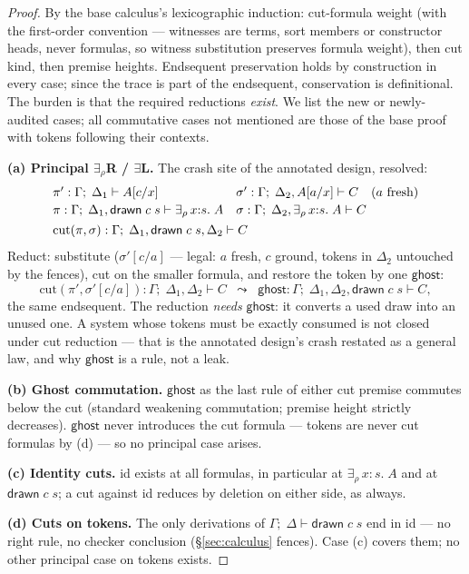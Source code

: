 \documentclass[11pt]{article}
\newcommand{\erho}[2]{\exists_{\rho}\, #1{:}#2.\;} %
\newcommand{\dtok}[2]{\mathsf{drawn}\;#1\;#2}      %
\newcommand{\ghost}{\mathsf{ghost}}
\newcommand{\seq}[3]{#1;\;#2\vdash #3}             %
\theoremstyle{definition}
\theoremstyle{remark}
\begin{document}
\begin{proof}
By the base calculus's lexicographic induction: cut-formula weight
(with the first-order convention --- witnesses are terms, sort members
or constructor heads, never formulas, so witness substitution preserves
formula weight), then cut kind, then premise heights.  Endsequent
preservation holds by construction in every case; since the trace is
part of the endsequent, conservation is definitional.  The burden is
that the required reductions \emph{exist}.  We list the new or
newly-audited cases; all commutative cases not mentioned are those of
the base proof with tokens following their contexts.

\medskip\noindent\textbf{(a) Principal $\exists_\rho$R / $\exists$L.}
The crash site of the annotated design, resolved:
\[
\begin{array}{ll}
\pi' : \seq{\Gamma}{\Delta_1}{A[c/x]}
& \sigma' : \seq{\Gamma}{\Delta_2, A[a/x]}{C} \quad (a\ \text{fresh})\\[2pt]
\pi : \seq{\Gamma}{\Delta_1, \dtok{c}{s}}{\erho{x}{s}A}
& \sigma : \seq{\Gamma}{\Delta_2, \erho{x}{s}A}{C}\\[4pt]
\multicolumn{2}{l}{\mathrm{cut}(\pi,\sigma) :
  \seq{\Gamma}{\Delta_1, \dtok{c}{s}, \Delta_2}{C}}
\end{array}
\]
Reduct: substitute ($\sigma'[c/a]$ --- legal: $a$ fresh, $c$ ground,
tokens in $\Delta_2$ untouched by the fences), cut on the smaller
formula, and restore the token by one $\ghost$:
\[
  \mathrm{cut}(\pi', \sigma'[c/a]) :
  \seq{\Gamma}{\Delta_1,\Delta_2}{C}
  \;\;\leadsto\;\;
  \ghost :
  \seq{\Gamma}{\Delta_1,\Delta_2,\dtok{c}{s}}{C},
\]
the same endsequent.  The reduction \emph{needs} $\ghost$: it converts
a used draw into an unused one.  A system whose tokens must be exactly
consumed is not closed under cut reduction --- that is the annotated
design's crash restated as a general law, and why $\ghost$ is a rule,
not a leak.

\medskip\noindent\textbf{(b) Ghost commutation.}  $\ghost$ as the last
rule of either cut premise commutes below the cut (standard weakening
commutation; premise height strictly decreases).  $\ghost$ never
introduces the cut formula --- tokens are never cut formulas by (d) ---
so no principal case arises.

\medskip\noindent\textbf{(c) Identity cuts.}  id exists at all
formulas, in particular at $\erho{x}{s}A$ and at $\dtok{c}{s}$; a cut
against id reduces by deletion on either side, as always.

\medskip\noindent\textbf{(d) Cuts on tokens.}  The only derivations of
$\seq{\Gamma}{\Delta}{\dtok{c}{s}}$ end in id --- no right rule, no
checker conclusion (\S\ref{sec:calculus} fences).  Case (c) covers
them; no other principal case on tokens exists.


\end{proof}
\end{document}
